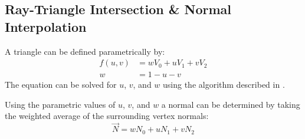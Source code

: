 \subsection{Ray-Triangle Intersection \& Normal Interpolation}
A triangle can be defined parametrically by:
\begin{equation}
\begin{split}
  f(u, v) &= wV_{0} + uV_{1} + vV_{2} \\
  w &= 1 - u - v
\end{split}
\end{equation}
The equation can be solved for $u$, $v$, and $w$ using the algorithm described
in \cite{8_moller_trumbore_1997}.

Using the parametric values of $u$, $v$, and $w$ a normal can be determined by
taking the weighted average of the surrounding vertex normals:
\begin{equation}
  \vec{N} = wN_{0} + uN_{1} + vN_{2}
\end{equation}

